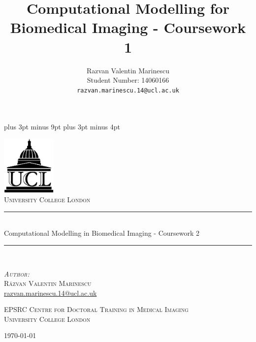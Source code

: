 \documentclass[12pt,a4paper,oneside]{report}
\title{Computational Modelling for Biomedical Imaging - Coursework 1}
\author{
Razvan Valentin Marinescu\\
Student Number: 14060166\\
\texttt{razvan.marinescu.14@ucl.ac.uk}
}
\begin{document}
\belowdisplayskip=12pt plus 3pt minus 9pt
\belowdisplayshortskip=7pt plus 3pt minus 4pt

\begin{titlepage}
\begin{center}

\includegraphics[width=0.2\textwidth]{ucl-logo2}~\\[1cm]

\textsc{\LARGE University College London}\\[1.5cm]


\newcommand{\HRule}{\rule{\linewidth}{0.5mm}}

\HRule \\[0.4cm]
{ \LARGE Computational Modelling in Biomedical Imaging - Coursework 2 \\[0.4cm] }

\HRule \\[1.5cm]

\begin{minipage}{0.4\textwidth}
\begin{center}
\textsc{\large
\emph{Author:}\\
R\u{a}zvan Valentin \textsc{Marinescu}}\\
\href{razvan.marinescu.14@ucl.ac.uk}{razvan.marinescu.14@ucl.ac.uk}\\

\end{center}
\end{minipage}

\vfill
\vfill
\vfill
\textsc{\large
EPSRC Centre for Doctoral Training in Medical Imaging\\ University College London}

\vfill

{\large \today}

\end{center}
\end{titlepage}
\end{document}

